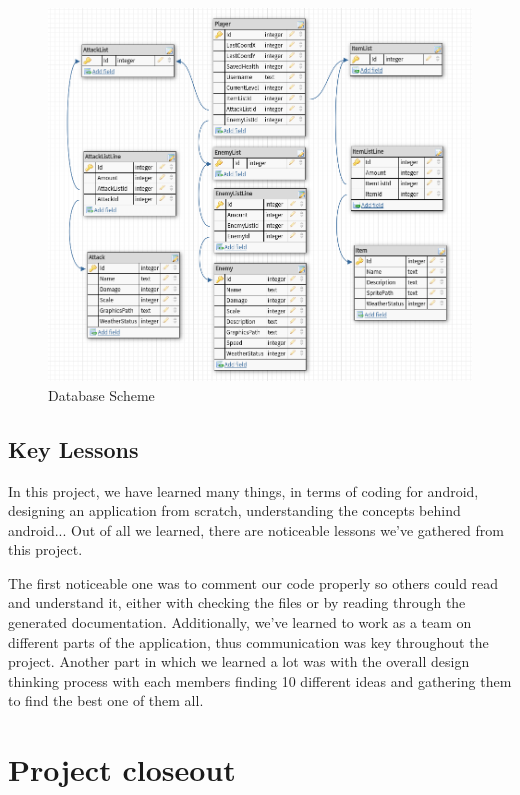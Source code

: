 \documentclass{sigchi}
\begin{document}
\begin{figure}
\label{fig:dbscheme}
	\centering
	\includegraphics[width=7in]{figures/UIDesign/DBScheme.png}
	\caption{Database Scheme} 
\end{figure}

\subsection{Key Lessons}
In this project, we have learned many things, in terms of coding for android, designing an application from scratch, understanding the concepts behind android... Out of all we learned, there are noticeable lessons we've gathered from this project. 

The first noticeable one was to comment our code properly so others could read and understand it, either with checking the files or by reading through the generated documentation. Additionally, we've learned to work as a team on different parts of the application, thus communication was key throughout the project.
Another part in which we learned a lot was with the overall design thinking process with each members finding 10 different ideas and gathering them to find the best one of them all.

\section{Project closeout}
\end{document}
